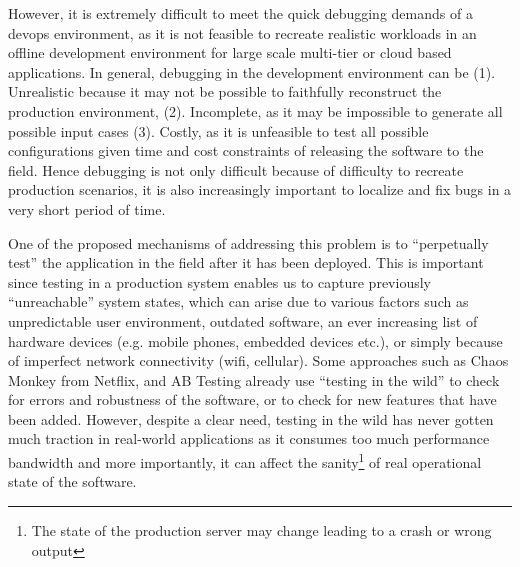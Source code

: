 However, it is extremely difficult to meet the quick debugging demands of a devops environment, as it is not feasible to recreate realistic workloads in an offline development environment for large scale multi-tier or cloud based applications.
In general, debugging in the development environment can be (1). Unrealistic because it may not be possible to faithfully reconstruct the production environment, (2). Incomplete, as it may be impossible to generate all possible input cases (3). Costly, as it is unfeasible to test all possible configurations given time and cost constraints of releasing the software to the field. 
Hence debugging is not only difficult because of difficulty to recreate production scenarios, it is also increasingly important to localize and fix bugs in a very short period of time.

One of the proposed mechanisms of addressing this problem is to ``perpetually test''\cite{perpetual} the application in the field after it has been deployed. 
This is important since testing in a production system enables us to capture previously ``unreachable'' system states, which can arise due to various factors such as unpredictable user environment, outdated software, an ever increasing list of hardware devices (e.g. mobile phones, embedded devices etc.), or simply because of imperfect network connectivity (wifi, cellular).
Some approaches such as Chaos Monkey\cite{chaosmonkey} from Netflix, and AB Testing\cite{abtesting} already use ``testing in the wild'' to check for errors and robustness of the software, or to check for new features that have been added.  
However, despite a clear need, testing in the wild has never gotten much traction in real-world applications as it consumes too much performance bandwidth and more importantly, it can affect the sanity\footnote{The state of the production server may change leading to a crash or wrong output} of real operational state of the software.


